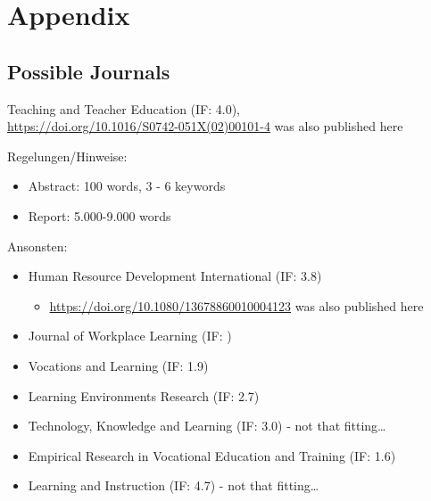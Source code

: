 \documentclass[
]{article}
\providecommand{\tightlist}{%
  \setlength{\itemsep}{0pt}\setlength{\parskip}{0pt}}
\begin{document}
\newpage

\section{Appendix}\label{appendix}

\subsection*{Possible Journals}\label{possible-journals}

Teaching and Teacher Education (IF: 4.0),\\
\url{https://doi.org/10.1016/S0742-051X(02)00101-4} was also published
here

Regelungen/Hinweise:

\begin{itemize}
\item
  Abstract: 100 words, 3 - 6 keywords
\item
  Report: 5.000-9.000 words
\end{itemize}

Ansonsten:

\begin{itemize}
\item
  Human Resource Development International (IF: 3.8)

  \begin{itemize}
  \tightlist
  \item
    \url{https://doi.org/10.1080/13678860010004123} was also published
    here
  \end{itemize}
\item
  Journal of Workplace Learning (IF: )
\item
  Vocations and Learning (IF: 1.9)
\item
  Learning Environments Research (IF: 2.7)
\item
  Technology, Knowledge and Learning (IF: 3.0) - not that
  fitting\ldots{}
\item
  Empirical Research in Vocational Education and Training (IF: 1.6)
\item
  Learning and Instruction (IF: 4.7) - not that fitting\ldots{}
\end{itemize}
\end{document}
